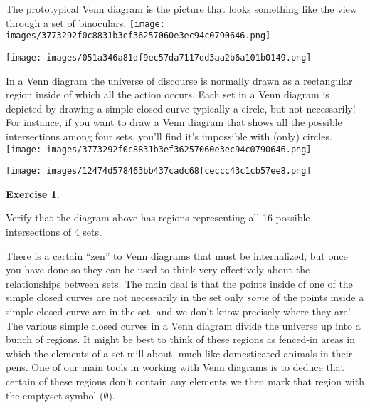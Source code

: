 \documentclass[10pt,]{book}
\theoremstyle{plain}
\theoremstyle{definition}
\theoremstyle{definition}
\newtheorem{exercise}[theorem]{Exercise}
\numberwithin{equation}{section}
\begin{document}
    The prototypical Venn diagram is the picture that looks something
    like the view through a set of binoculars.
\texttt{[image: images/3773292f0c8831b3ef36257060e3ec94c0790646.png]}
\par

    \ifx\SetFigFont\undefined\gdef\SetFigFont#1#2#3#4#5{
    \reset@font\fontsize{#1}{#2pt}
    \fontfamily{#3}\fontseries{#4}\fontshape{#5}
    \selectfont}\fi
\texttt{[image: images/051a346a81df9ec57da7117dd3aa2b6a101b0149.png]}
\par

    In a Venn diagram the
    universe of discourse is normally drawn as
    a rectangular region inside of which all the action occurs. Each
    set in a Venn diagram is depicted by drawing a simple closed curve \textemdash{} typically a circle, but not necessarily! For instance, if you
    want to draw a Venn diagram that shows all the possible intersections
    among four sets, you'll find it's impossible with (only) circles.
\texttt{[image: images/3773292f0c8831b3ef36257060e3ec94c0790646.png]}
\par

    \ifx\SetFigFont\undefined\gdef\SetFigFont#1#2#3#4#5{
    \reset@font\fontsize{#1}{#2pt}
    \fontfamily{#3}\fontseries{#4}\fontshape{#5}
    \selectfont}\fi
\texttt{[image: images/12474d578463bb437cadc68fceccc43c1cb57ee8.png]}
\begin{exercise}\label{exercise-40}

        Verify that the diagram above has regions representing all 16 possible
        intersections of 4 sets.
\end{exercise}
\par

    There is a certain ``zen'' to Venn diagrams that must be internalized,
    but once you have done so they can be used to think very effectively
    about the relationships between sets. The main deal is that the points
    inside of one of the simple closed curves are not necessarily in the set \textemdash{} only \emph{some} of the points inside a simple closed curve are in the
    set, and we don't know precisely where they are! The various simple closed
    curves in a Venn diagram divide the universe up into a bunch of regions.
    It might be best to think of these regions as fenced-in areas in which
    the elements of a set mill about, much like domesticated animals
    in their pens.
    One of our main tools in working with Venn diagrams is to deduce that
    certain of these regions don't contain any elements \textemdash{} we then mark that
    region with the emptyset symbol (\(\emptyset\)).
\par
\end{document}
